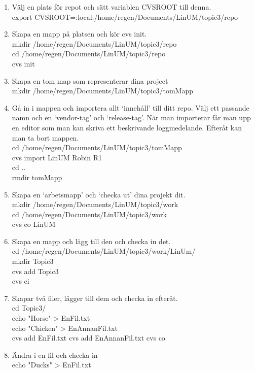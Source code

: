 \documentclass[11pt]{article}
\begin{document}
\begin{enumerate}
\item Välj en plats för repot och sätt variablen CVSROOT till denna.\\
export CVSROOT=:local:/home/regen/Documents/LinUM/topic3/repo
\item Skapa en mapp på platsen och kör cvs init.\\
mkdir /home/regen/Documents/LinUM/topic3/repo\\
cd /home/regen/Documents/LinUM/topic3/repo\\
cvs init
\item Skapa en tom map som representerar dina project \\
mkdir /home/regen/Documents/LinUM/topic3/tomMapp
\item Gå in i mappen och importera allt `innehåll' till ditt repo. Välj ett passande namn och en `vendor-tag' och `release-tag'. När man importerar får man upp en editor som man kan skriva ett beskrivande loggmedelande. Efteråt kan man ta bort mappen.\\
cd /home/regen/Documents/LinUM/topic3/tomMapp\\
cvs import LinUM Robin R1\\
cd ..\\
rmdir tomMapp
\item Skapa en `arbetsmapp' och `checka ut' dina projekt dit.\\
mkdir /home/regen/Documents/LinUM/topic3/work\\
cd /home/regen/Documents/LinUM/topic3/work\\
cvs co LinUM
\item Skapa en mapp och lägg till den och checka in det.\\
cd /home/regen/Documents/LinUM/topic3/work/LinUm/\\
mkdir Topic3\\
cvs add Topic3\\
cvs ci\\
\item Skapar två filer, lägger till dem och checka in efteråt. \\
cd Topic3/\\
echo "Horse" > EnFil.txt\\
echo "Chicken" > EnAnnanFil.txt\\
cvs add EnFil.txt
cvs add EnAnnanFil.txt
cvs co
\item Ändra i en fil och checka in\\
echo "Ducks" > EnFil.txt
\end{enumerate}
\end{document}

